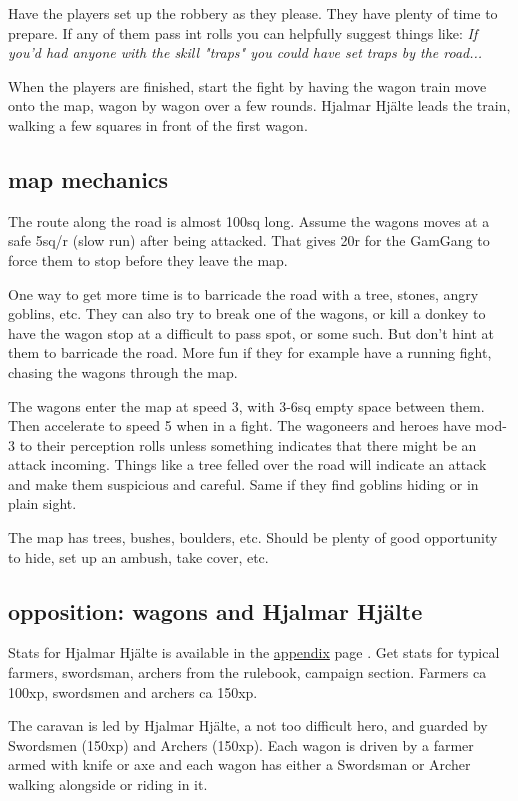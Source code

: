 Have the players set up the robbery as they please. They have plenty of time to prepare. If any of them pass int rolls you can helpfully suggest things like: \emph{If you'd had anyone with the skill "traps" you could have set traps by the road...}

When the players are finished, start the fight by having the wagon train move onto the map, wagon by wagon over a few rounds. Hjalmar Hjälte leads the train, walking a few squares in front of the first wagon.


\subsection*{map mechanics}

The route along the road is almost 100sq long. Assume the wagons moves at a safe 5sq/r (slow run) after being attacked. That gives 20r for the GamGang to force them to stop before they leave the map.

One way to get more time is to barricade the road with a tree, stones, angry goblins, etc. They can also try to break one of the wagons, or kill a donkey to have the wagon stop at a difficult to pass spot, or some such. But don't hint at them to barricade the road. More fun if they for example have a running fight, chasing the wagons through the map.

The wagons enter the map at speed 3, with 3-6sq empty space between them. Then accelerate to speed 5 when in a fight. The wagoneers and heroes have mod-3 to their perception rolls unless something indicates that there might be an attack incoming. Things like a tree felled over the road will indicate an attack and make them suspicious and careful. Same if they find goblins hiding or in plain sight.

The map has trees, bushes, boulders, etc. Should be plenty of good opportunity to hide, set up an ambush, take cover, etc.


\subsection*{opposition: wagons and Hjalmar Hjälte}

Stats for Hjalmar Hjälte is available in the \hyperref[hjalmarhjalte]{appendix} page \pageref{hjalmarhjalte}. Get stats for typical farmers, swordsman, archers from the rulebook, campaign section. Farmers ca 100xp, swordsmen and archers ca 150xp.

The caravan is led by Hjalmar Hjälte, a not too difficult hero, and guarded by Swordsmen (150xp) and Archers (150xp). Each wagon is driven by a farmer armed with knife or axe and each wagon has either a Swordsman or Archer walking alongside or riding in it.

